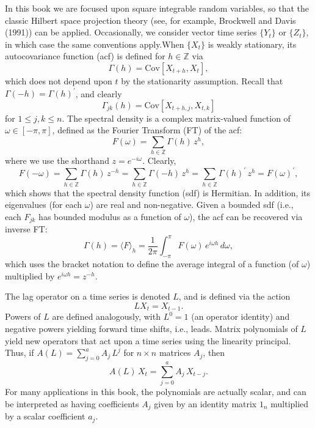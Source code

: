 \documentclass[a4paper]{book}
\def\ZZ{\mathbb Z}
\begin{document}
 In this book we are focused upon square integrable random variables,
 so that the classic Hilbert space projection theory (see, for example,
 Brockwell and Davis (1991)) can be applied.   Occasionally, we consider 
  vector time series $\{ Y_t \}$ or $\{ Z_t \}$, in which case the 
 same conventions apply.When $\{ X_t \}$ is 
 weakly stationary, its autocovariance function (acf)
 is defined for $h \in \ZZ$  via 
\[
   \Gamma (h) = \mbox{Cov} [ X_{t+h}, X_t ],
\]
 which does not depend upon $t$ by the stationarity assumption.  Recall
 that $\Gamma (-h) = { \Gamma (h) }^{\prime}$, and clearly
\[
   \Gamma_{jk} (h) = \mbox{Cov} [ X_{t+h,j}, X_{t,k} ]
\]
 for $1 \leq j,k \leq n$. The spectral density is a complex matrix-valued
 function of $\omega \in [-\pi, \pi]$, defined as the 
 Fourier Transform (FT) of the acf:
\[
   F (\omega) = \sum_{h \in \ZZ} \Gamma (h) \, z^h,
\]
 where we use the shorthand $z = e^{-i \omega}$.  Clearly,
\[
    F(-\omega) = 
   \sum_{h \in \ZZ} \Gamma (h) \, z^{-h} 
   = \sum_{h \in \ZZ} \Gamma (-h) \, z^h = 
  \sum_{h \in \ZZ} { \Gamma (h) }^{\prime} \, z^h = { F (\omega) }^{\prime},
\]
 which shows that the spectral density function (sdf) is Hermitian.
  In addition, its eigenvalues (for each $\omega$) are real and non-negative.
  Given a bounded sdf (i.e., each $F_{jk} $ has bounded modulus as a function
 of $\omega$), the acf can be recovered via inverse FT:
\begin{equation}
 \label{eq:spec2acf}
  \Gamma (h) = { \langle F  \rangle }_h
  =  \frac{1}{2 \pi} \int_{-\pi}^{\pi} F(\omega) \, e^{i \omega h}
  \, d\omega,
\end{equation}
 which uses the bracket notation to define the average integral of a 
 function (of $\omega$) multiplied by $e^{i \omega h} = z^{-h}$.

 The lag operator on a time series is denoted $L$, and is defined via
 the action
\[
  L X_t = X_{t-1}.
\]
  Powers  of $L$ are defined analogously, with $L^0 = 1$ (an operator
 identity) and negative powers yielding forward time shifts, i.e., leads.
 Matrix polynomials of $L$ yield new operators that act upon a time series
 using the linearity principal.  Thus, if $A(L) = \sum_{j=0}^a A_j \, L^j$
 for $n \times n$ matrices $A_j$, then
\[
  A(L) \, X_t = \sum_{j=0}^a A_j \, X_{t-j}.
\] 
  For many applications in this book, the polynomials are actually scalar,
 and can be interpreted as having coefficients $A_j$ given by an  
 identity matrix $1_n$ multiplied by a scalar coefficient $a_j$.
\end{document}
